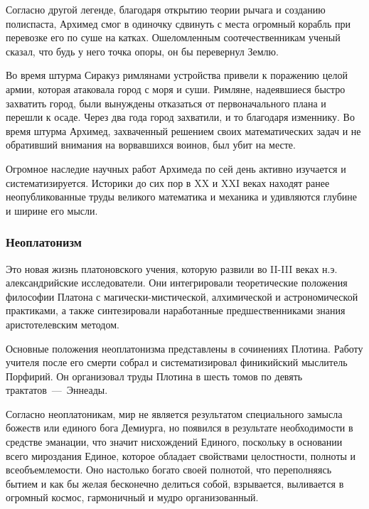 Согласно другой легенде, благодаря открытию теории рычага и созданию полиспаста, Архимед смог в одиночку сдвинуть с места огромный корабль при перевозке его по суше на катках. Ошеломленным соотечественникам ученый сказал, что будь у него точка опоры, он бы перевернул Землю. 

Во время штурма Сиракуз римлянами устройства привели к поражению целой армии, которая атаковала город с моря и суши. Римляне, надеявшиеся быстро захватить город, были вынуждены отказаться от первоначального плана и перешли к осаде. Через два года город захватили, и то благодаря изменнику. Во время штурма Архимед, захваченный решением своих математических задач и не обративший внимания на ворвавшихся воинов, был убит на месте. 

Огромное наследие научных работ Архимеда по сей день активно изучается и систематизируется. Историки до сих пор в XX и XXI веках находят ранее неопубликованные труды великого математика и механика и удивляются
глубине и ширине его мысли. 

\subsubsection{Неоплатонизм}

Это новая жизнь платоновского учения, которую развили во II-III веках н.э.
александрийские исследователи. Они интегрировали теоретические положения
философии Платона с магически-мистической, алхимической и астрономической
практиками, а также синтезировали наработанные предшественниками знания 
аристотелевским методом. 

Основные положения неоплатонизма представлены в сочинениях Плотина. Работу учителя после его смерти собрал и систематизировал финикийский мыслитель Порфирий. Он организовал труды Плотина в шесть томов по девять трактатов~---~Эннеады.


Согласно неоплатоникам, мир не является результатом специального замысла божеств или единого бога Демиурга, но появился в результате необходимости в средстве эманации, что значит нисхождений Единого, поскольку в основании всего мироздания Единое, которое обладает свойствами целостности, полноты и всеобъемлемости. Оно настолько богато своей полнотой, что переполняясь бытием и как бы желая бесконечно делиться собой, взрывается, выливается в огромный космос, гармоничный и мудро организованный. 

